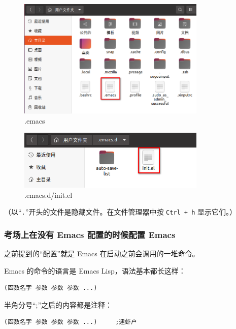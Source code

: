 \documentclass[UTF-8]{ctexart}
\begin{document}
				\begin{figure}[H]
					\centering
					\includegraphics[width=0.8\textwidth]{fig/place_emacs.png}
					\caption*{.emacs}
				\end{figure}
			
				\begin{figure}[H]
					\centering
					\includegraphics[width=0.8\textwidth]{fig/place_init_el.png}
					\caption*{.emacs.d/init.el}
				\end{figure}
				
				（以“\texttt{.}”开头的文件是隐藏文件。在文件管理器中按 \texttt{Ctrl + h} 显示它们。）
			
			\subsubsection{考场上在没有 Emacs 配置的时候配置 Emacs}
			
				之前提到的“配置”就是 Emacs 在启动之前会调用的一堆命令。
				
				Emacs 的命令的语言是 Emacs Lisp，语法基本都长这样：
				
				\begin{verbatim}
(函数名字 参数 参数 参数 ...)
				\end{verbatim}
			
				半角分号“;”之后的内容都是注释：
				
				\begin{verbatim}
(函数名字 参数 参数 参数 ...)     ;逮虾户
				\end{verbatim}
			
\end{document}
